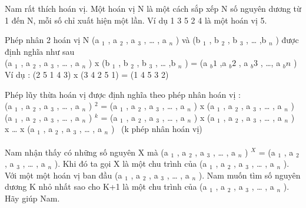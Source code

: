 Nam rất thích hoán vị. Một hoán vị N là một cách sắp xếp N số nguyên dương từ 1 đến N, mỗi số chỉ xuất hiện một lần. Ví dụ 1 3 5 2 4 là một hoán vị 5.

Phép nhân 2 hoán vị N (a $_ 1 $ , a $_ 2 $ , a $_ 3 $ , … , a $_ n $ ) và (b $_ 1 $ , b $_ 2 $ , b $_ 3 $ , … ,b $_ n $ ) được định nghĩa như sau
\\(a $_ 1 $ , a $_ 2 $ , a $_ 3 $ , … , a $_ n $ ) x (b $_ 1 $ , b $_ 2 $ , b $_ 3 $ , … ,b $_ n $ ) = (a $_ b1 $ ,a $_ b2 $ , a $_ b3 $ , …, a $_ bn $ )
\\Ví dụ : (2 5 1 4 3) x (3 4 2 5 1) = (1 4 5 3 2)

Phép lũy thừa hoán vị được định nghĩa theo phép nhân hoán vị :
\\(a $_ 1 $ , a $_ 2 $ , a $_ 3 $ , … , a $_ n $ ) $^ 2 $ = (a $_ 1 $ , a $_ 2 $ , a $_ 3 $ , … , a $_ n $ ) x (a $_ 1 $ , a $_ 2 $ , a $_ 3 $ , … , a $_ n $ )
\\(a $_ 1 $ , a $_ 2 $ , a $_ 3 $ , … , a $_ n $ ) $^ k $ = (a $_ 1 $ , a $_ 2 $ , a $_ 3 $ , … , a $_ n $ ) x (a $_ 1 $ , a $_ 2 $ , a $_ 3 $ , … , a $_ n $ ) x … x (a $_ 1 $ , a $_ 2 $ , a $_ 3 $ , … , a $_ n $ )  (k phép nhân hoán vị)
\\
\\Nam nhận thấy có những số nguyên X mà (a $_ 1 $ , a $_ 2 $ , a $_ 3 $ , … , a $_ n $ ) $^ X $ = (a $_ 1 $ , a $_ 2 $ , a $_ 3 $ , … , a $_ n $ ). Khi đó ta gọi X là một chu trình của (a $_ 1 $ , a $_ 2 $ , a $_ 3 $ , … , a $_ n $ ).
\\Với một một hoán vị ban đầu (a $_ 1 $ , a $_ 2 $ , a $_ 3 $ , … , a $_ n $ ). Nam muốn tìm số nguyên dương K nhỏ nhất sao cho K+1 là một chu trình của (a $_ 1 $ , a $_ 2 $ , a $_ 3 $ , … , a $_ n $ ). Hãy giúp Nam.
